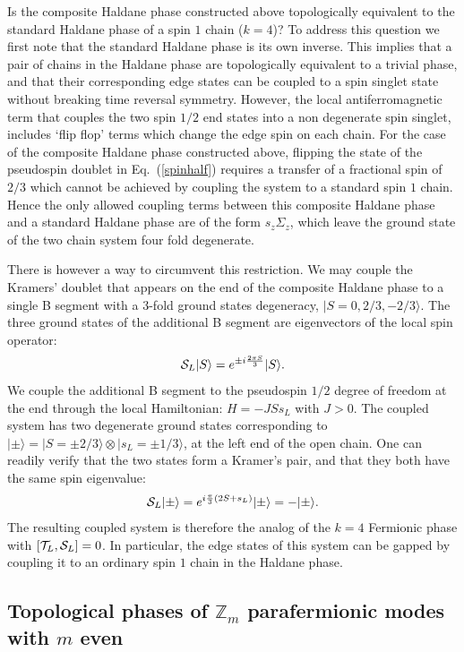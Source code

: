 \documentclass[twocolumn,aps,prb,showpacs]{revtex4-1}
\begin{document}
Is the composite Haldane phase constructed above  topologically equivalent to the standard Haldane phase of a spin $1$ chain ($k=4$)? To address this question we first note that the standard Haldane phase is its own inverse. This implies  that a pair of  chains in  the Haldane phase are topologically equivalent to a trivial phase, and that their corresponding edge states can be coupled to a spin singlet state without breaking time reversal symmetry. However, the local antiferromagnetic term that couples the two spin $1/2$ end states  into a non degenerate spin singlet, includes  `flip flop' terms which  change the  edge spin on each chain. For the case of the composite Haldane phase constructed above, flipping the state of the pseudospin doublet in Eq.~(\ref{spinhalf}) requires a transfer of a fractional spin of $2/3 $ which cannot be achieved by coupling the system to a standard spin $ 1$ chain.
Hence the  only allowed coupling terms between this composite Haldane phase and a standard Haldane phase are of the form $ s_z \Sigma_z$, which leave the ground state of the two chain system four fold degenerate.


There is however a way to circumvent this restriction. We may couple the Kramers' doublet that appears on the end of the composite Haldane phase to a single B segment with a 3-fold ground states degeneracy, $|S = 0,2/3, -2/3\rangle $.
The three ground states of the additional B segment are eigenvectors of the local spin operator:
\begin{align}
{\cal S}_L |S\rangle = e^{\pm i\frac{2\pi S}{3} }|S\rangle.
\end{align}
We couple the additional B segment to the pseudospin $1/2$ degree of freedom at the end through the local Hamiltonian:
 $H = -J S s_L$ with $J>0$.
The coupled system has two degenerate ground states  corresponding to $|\pm\rangle = |S=\pm 2/3 \rangle \otimes | s_L = \pm1/3\rangle$, at the left end of the open chain. One can readily verify that the two states form a Kramer's pair, and that they both have the same spin eigenvalue:
\begin{align}
{\cal S}_L |\pm\rangle = e^{ i\frac{\pi}{3}(2S+s_L) }|\pm\rangle = -|\pm\rangle.
\end{align}
The resulting coupled system is therefore the analog of the $k=4  $ Fermionic phase with $[{\cal T}_L,{\cal S}_L]=0$. In particular,
the edge states of this system can be gapped by coupling it to an ordinary spin $1$ chain in the Haldane phase.


\subsection{Topological phases of $ \mathbb{Z}_{m}$ parafermionic modes with $m$  even}
\end{document}
